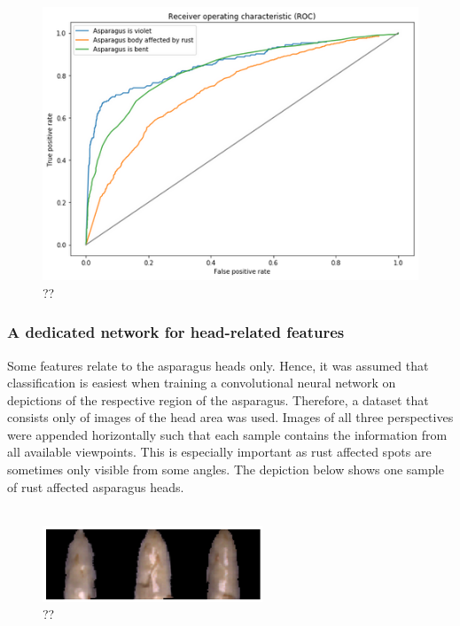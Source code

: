 \\
\begin{figure}[h]
	\centering
	\includegraphics[scale=0.6]{Figures/chapter04/fe_roc}
	\decoRule
	\caption[??]{??}
	\label{fig:FeatureEngineeringROC}
\end{figure}

\subsubsection{A dedicated network for head-related features}

Some features relate to the asparagus heads only. Hence, it was assumed that classification is easiest when training a convolutional neural network on depictions of the respective region of the asparagus. Therefore, a dataset that consists only of images of the head area was used. Images of all three perspectives were appended horizontally such that each sample contains the information from all available viewpoints. This is especially important as rust affected spots are sometimes only visible from some angles. The depiction below shows one sample of rust affected asparagus heads. \\
\\
\begin{figure}[h]
	\centering
	\includegraphics[scale=0.6]{Figures/chapter04/fe_head}
	\decoRule
	\caption[??]{??}
	\label{fig:FeatureEngineeringHead}
\end{figure}

